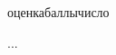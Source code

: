\documentclass[../document.tex]{subfiles}
\begin{document}
    \begin{supervisorreview}{оценка}{баллы}{число}
        \par ...
    \end{supervisorreview}
\end{document}
